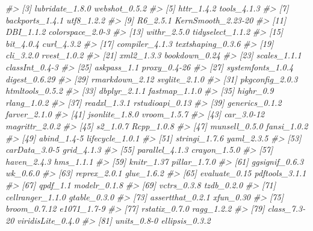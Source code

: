 \documentclass[
]{book}
\newenvironment{Shaded}{\begin{snugshade}}{\end{snugshade}}
\newcommand{\CommentTok}[1]{\textcolor[rgb]{0.56,0.35,0.01}{\textit{#1}}}
\theoremstyle{definition}
\theoremstyle{definition}
\theoremstyle{definition}
\theoremstyle{definition}
\theoremstyle{remark}
\begin{document}
\begin{Shaded}
\begin{Highlighting}[]
\CommentTok{\#\textgreater{}  [3] lubridate\_1.8.0    webshot\_0.5.2     }
\CommentTok{\#\textgreater{}  [5] httr\_1.4.2         tools\_4.1.3       }
\CommentTok{\#\textgreater{}  [7] backports\_1.4.1    utf8\_1.2.2        }
\CommentTok{\#\textgreater{}  [9] R6\_2.5.1           KernSmooth\_2.23{-}20}
\CommentTok{\#\textgreater{} [11] DBI\_1.1.2          colorspace\_2.0{-}3  }
\CommentTok{\#\textgreater{} [13] withr\_2.5.0        tidyselect\_1.1.2  }
\CommentTok{\#\textgreater{} [15] bit\_4.0.4          curl\_4.3.2        }
\CommentTok{\#\textgreater{} [17] compiler\_4.1.3     textshaping\_0.3.6 }
\CommentTok{\#\textgreater{} [19] cli\_3.2.0          rvest\_1.0.2       }
\CommentTok{\#\textgreater{} [21] xml2\_1.3.3         bookdown\_0.24     }
\CommentTok{\#\textgreater{} [23] scales\_1.1.1       classInt\_0.4{-}3    }
\CommentTok{\#\textgreater{} [25] askpass\_1.1        proxy\_0.4{-}26      }
\CommentTok{\#\textgreater{} [27] systemfonts\_1.0.4  digest\_0.6.29     }
\CommentTok{\#\textgreater{} [29] rmarkdown\_2.12     svglite\_2.1.0     }
\CommentTok{\#\textgreater{} [31] pkgconfig\_2.0.3    htmltools\_0.5.2   }
\CommentTok{\#\textgreater{} [33] dbplyr\_2.1.1       fastmap\_1.1.0     }
\CommentTok{\#\textgreater{} [35] highr\_0.9          rlang\_1.0.2       }
\CommentTok{\#\textgreater{} [37] readxl\_1.3.1       rstudioapi\_0.13   }
\CommentTok{\#\textgreater{} [39] generics\_0.1.2     farver\_2.1.0      }
\CommentTok{\#\textgreater{} [41] jsonlite\_1.8.0     vroom\_1.5.7       }
\CommentTok{\#\textgreater{} [43] car\_3.0{-}12         magrittr\_2.0.2    }
\CommentTok{\#\textgreater{} [45] s2\_1.0.7           Rcpp\_1.0.8        }
\CommentTok{\#\textgreater{} [47] munsell\_0.5.0      fansi\_1.0.2       }
\CommentTok{\#\textgreater{} [49] abind\_1.4{-}5        lifecycle\_1.0.1   }
\CommentTok{\#\textgreater{} [51] stringi\_1.7.6      yaml\_2.3.5        }
\CommentTok{\#\textgreater{} [53] carData\_3.0{-}5      grid\_4.1.3        }
\CommentTok{\#\textgreater{} [55] parallel\_4.1.3     crayon\_1.5.0      }
\CommentTok{\#\textgreater{} [57] haven\_2.4.3        hms\_1.1.1         }
\CommentTok{\#\textgreater{} [59] knitr\_1.37         pillar\_1.7.0      }
\CommentTok{\#\textgreater{} [61] ggsignif\_0.6.3     wk\_0.6.0          }
\CommentTok{\#\textgreater{} [63] reprex\_2.0.1       glue\_1.6.2        }
\CommentTok{\#\textgreater{} [65] evaluate\_0.15      pdftools\_3.1.1    }
\CommentTok{\#\textgreater{} [67] qpdf\_1.1           modelr\_0.1.8      }
\CommentTok{\#\textgreater{} [69] vctrs\_0.3.8        tzdb\_0.2.0        }
\CommentTok{\#\textgreater{} [71] cellranger\_1.1.0   gtable\_0.3.0      }
\CommentTok{\#\textgreater{} [73] assertthat\_0.2.1   xfun\_0.30         }
\CommentTok{\#\textgreater{} [75] broom\_0.7.12       e1071\_1.7{-}9       }
\CommentTok{\#\textgreater{} [77] rstatix\_0.7.0      ragg\_1.2.2        }
\CommentTok{\#\textgreater{} [79] class\_7.3{-}20       viridisLite\_0.4.0 }
\CommentTok{\#\textgreater{} [81] units\_0.8{-}0        ellipsis\_0.3.2}
\end{Highlighting}
\end{Shaded}


  
\end{document}
